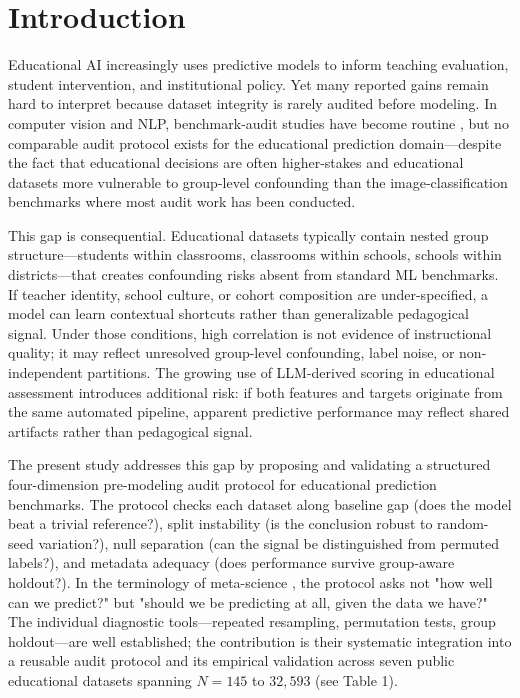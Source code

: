 \section{Introduction}

Educational AI increasingly uses predictive models to inform teaching evaluation, student intervention, and institutional policy. Yet many reported gains remain hard to interpret because dataset integrity is rarely audited before modeling. In computer vision and NLP, benchmark-audit studies have become routine \citep{Northcutt2021,Recht2019,Bouthillier2021}, but no comparable audit protocol exists for the educational prediction domain---despite the fact that educational decisions are often higher-stakes and educational datasets more vulnerable to group-level confounding than the image-classification benchmarks where most audit work has been conducted.

This gap is consequential. Educational datasets typically contain nested group structure---students within classrooms, classrooms within schools, schools within districts---that creates confounding risks absent from standard ML benchmarks. If teacher identity, school culture, or cohort composition are under-specified, a model can learn contextual shortcuts rather than generalizable pedagogical signal. Under those conditions, high correlation is not evidence of instructional quality; it may reflect unresolved group-level confounding, label noise, or non-independent partitions. The growing use of LLM-derived scoring in educational assessment introduces additional risk: if both features and targets originate from the same automated pipeline, apparent predictive performance may reflect shared artifacts rather than pedagogical signal.

The present study addresses this gap by proposing and validating a structured four-dimension pre-modeling audit protocol for educational prediction benchmarks. The protocol checks each dataset along baseline gap (does the model beat a trivial reference?), split instability (is the conclusion robust to random-seed variation?), null separation (can the signal be distinguished from permuted labels?), and metadata adequacy (does performance survive group-aware holdout?). In the terminology of meta-science \citep{Ioannidis2005}, the protocol asks not "how well can we predict?" but "should we be predicting at all, given the data we have?" The individual diagnostic tools---repeated resampling, permutation tests, group holdout---are well established; the contribution is their systematic integration into a reusable audit protocol and its empirical validation across seven public educational datasets spanning $N = 145$ to $32{,}593$ (see Table 1).

